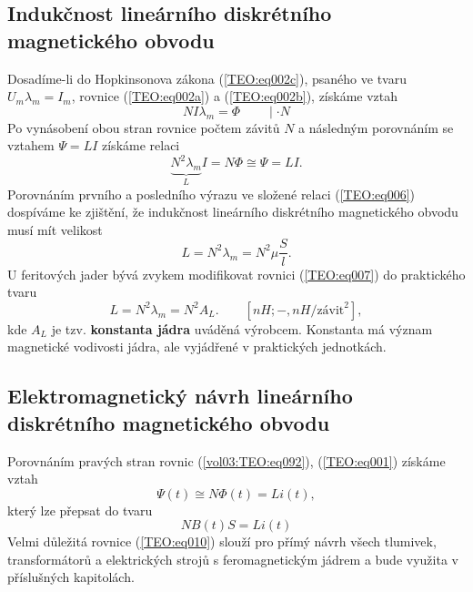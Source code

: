     \subsection{Indukčnost lineárního diskrétního magnetického obvodu}
      Dosadíme-li do Hopkinsonova zákona (\ref{TEO:eq002c}), psaného ve tvaru \(U_m\lambda_m=I_m\), 
      rovnice (\ref{TEO:eq002a}) a (\ref{TEO:eq002b}), získáme vztah
      \begin{equation}  \label{TEO:eq005}
        NI\lambda_m = \Phi\qquad\mid \cdot N
      \end{equation}
      Po vynásobení obou stran rovnice počtem závitů \(N\) a následným porovnáním se vztahem \(\Psi 
      = LI\) získáme relaci
      \begin{equation}  \label{TEO:eq006}
        \underbrace{N^2\lambda_m}_L I = N\Phi \cong\Psi = LI.
      \end{equation}
      Porovnáním prvního a posledního výrazu ve složené relaci (\ref{TEO:eq006}) dospíváme ke 
      zjištění, že indukčnost lineárního diskrétního magnetického obvodu musí mít velikost
      \begin{equation}  \label{TEO:eq007}
        \boxed{L = N^2\lambda_m = N^2\mu\frac{S}{l}.}
      \end{equation}
      U feritových jader bývá zvykem modifikovat rovnici (\ref{TEO:eq007}) do praktického tvaru 
      \begin{equation}  \label{TEO:eq008}
        \boxed{L = N^2\lambda_m = N^2A_L.} \qquad [nH; -, nH/\text{závit}^2],
      \end{equation}
      kde \(A_L\) je tzv. \textbf{konstanta jádra} uváděná výrobcem. Konstanta má význam magnetické 
      vodivosti jádra, ale vyjádřené v praktických jednotkách.

    \subsection{Elektromagnetický návrh lineárního diskrétního magnetického obvodu}
       Porovnáním pravých stran rovnic (\ref{vol03:TEO:eq092}), (\ref{TEO:eq001}) získáme vztah
      \begin{equation}  \label{TEO:eq009}
        \Psi(t) \cong N\Phi(t) = Li(t),
      \end{equation}
      který lze přepsat do tvaru
      \begin{equation}  \label{TEO:eq010}
        \boxed{NB(t)S = Li(t)}
      \end{equation}
      Velmi důležitá rovnice (\ref{TEO:eq010}) slouží pro přímý návrh všech tlumivek, 
      transformátorů a elektrických strojů s feromagnetickým jádrem a bude využita v příslušných 
      kapitolách.
      

